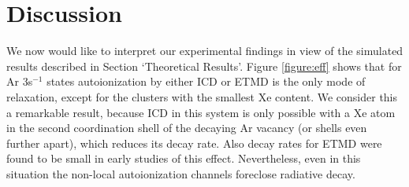 \section{Discussion
\label{sec:discussion}}
%
%
%
%
%
%
We now would like to interpret our experimental findings in view of the simulated results described in Section `Theoretical Results'.
Figure \ref{figure:eff} shows that for Ar 3s$^{-1}$ states autoionization by either ICD or ETMD is the only mode of relaxation, except for the clusters with the smallest Xe content.
We consider this a remarkable result, because ICD in this system is only possible with a Xe atom in the second coordination shell of the decaying Ar vacancy (or shells even further apart), which reduces its decay rate.
Also decay rates for ETMD were found to be small in early studies of this effect.\cite{zobeley}
Nevertheless, even in this situation the non-local autoionization channels foreclose radiative decay.

